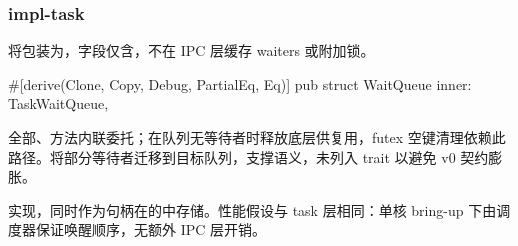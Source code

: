 
\subsubsection{impl-task}

将包装为，字段仅含，不在 IPC 层缓存 waiters 或附加锁。

\begin{rustcode}
#[derive(Clone, Copy, Debug, PartialEq, Eq)]
pub struct WaitQueue {
    inner: TaskWaitQueue,
}
\end{rustcode}

全部、方法内联委托；在队列无等待者时释放底层供复用，futex 空键清理依赖此路径。将部分等待者迁移到目标队列，支撑语义，未列入 trait 以避免 v0 契约膨胀。

实现，同时作为句柄在的中存储。性能假设与 task 层相同：单核 bring-up 下由调度器保证唤醒顺序，无额外 IPC 层开销。
